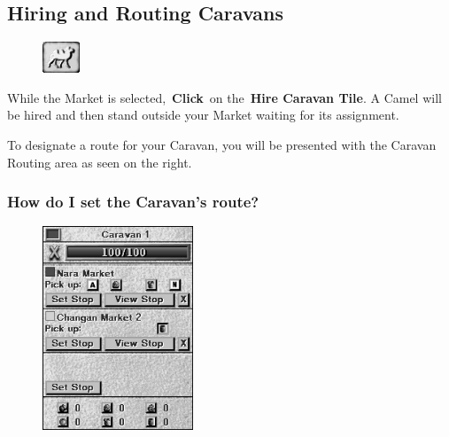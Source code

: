 \subsection{Hiring and Routing Caravans}

\begin{figure}
	\vspace{-20pt}
	\begin{center}
		\includegraphics[width=0.1\textwidth]{Tcamel}
	\end{center}
	\vspace{-20pt}
\end{figure}


While the Market is selected, \textbf{Click} on the \textbf{Hire Caravan Tile}. A Camel will be hired and then stand outside your Market waiting for its assignment.

To designate a route for your Caravan, you will be presented with the Caravan Routing area as seen on the right.

\subsubsection{How do I set the Caravan’s route?}

\begin{figure}
	\vspace{-20pt}
	\begin{center}
		\includegraphics[width=0.4\textwidth]{Icamelinfo}
	\end{center}
	\vspace{-20pt}
\end{figure}


